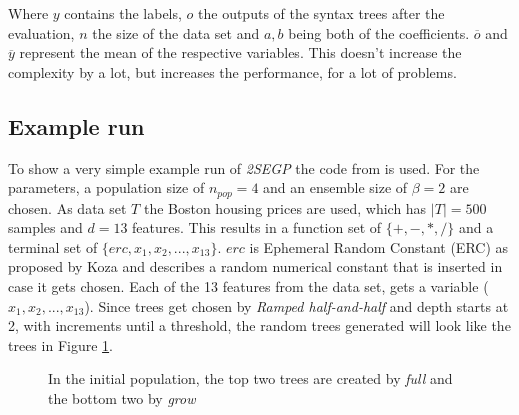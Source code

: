 \documentclass[tikz, runningheads]{llncs}
\begin{document}
Where $y$ contains the labels, $o$ the outputs of the syntax trees after the evaluation, $n$ the size of the data set and $a, b$
being both of the coefficients. $\overline{o}$ and $\overline{y}$ represent the mean of the respective variables.
This doesn't increase the complexity by a lot, but increases the performance, for a lot of problems. 


\subsection{Example run}
To show a very simple example run of \textit{2SEGP} the code from \cite{Github2SEGP} is used. For the parameters, 
a population size of $n_{pop} = 4$ and an ensemble size of $\beta = 2$ are chosen. 
As data set $T$ the Boston housing prices are used, which has $|T| = 500$ samples and $d = 13$ features. This results in a function set 
of $\{+, -, *, /\}$ and a terminal set of $\{erc, x_1, x_2, ..., x_{13}\}$. $erc$ is
Ephemeral Random Constant (ERC) as proposed by Koza \cite{Koza} and describes a random numerical constant that is 
inserted in case it gets chosen. Each of the 13 features from the data set, gets a
variable ($x_1, x_2, ..., x_{13}$). Since trees get chosen by \textit{Ramped half-and-half} and depth starts at 2, with increments until a threshold, the 
random trees generated will look like the trees in Figure \ref{exampleInitialPop}.

\begin{figure}[htbp]
	\centering
	\begin{adjustbox}{valign=t}
		\scalebox{0.7}{
		\begin{forest}
			[-
				[/
					[$x_4$]
					[$x_5$]
				]	
				[-
					[$x_9$]
					[$x_8$]
				]
			]
		\end{forest}
		}
	\end{adjustbox}\qquad
	\begin{adjustbox}{valign=t}
		\scalebox{0.6}{
		\begin{forest}
			[-
				[-
					[+
						[$x_6$]
						[$-2.438$]
					]
					[+
						[$x_9$]
						[$x_8$]
					]
				]
				[/
					[*
						[$x_{11}$]
						[$x_8$]
					]
					[*
						[$x_8$]
						[$x_1$]
					]
				]	
			]
		\end{forest}
		}
	\end{adjustbox}\qquad
	\begin{adjustbox}{valign=t}
		\scalebox{0.7}{
		\begin{forest}
			[/
				[+
					[$x_{10}$]
					[$x_8$]
				]
				[$x_7$]
			]
		\end{forest}
		}
	\end{adjustbox}\qquad
	\begin{adjustbox}{valign=t}
		\scalebox{0.5}{
		\begin{forest}
			[+
				[/
					[-
						[$x_{12}$]
						[$x_{10}$]
					]
					[$x_12$]
				]
				[/
					[$3.866$]
					[$x_6$]
				]	
			]
		\end{forest}
		}
	\end{adjustbox}
	\caption{In the initial population, the top two trees are created by \textit{full} and the bottom two by 
	\textit{grow}} \label{exampleInitialPop}
\end{figure}
\end{document}
